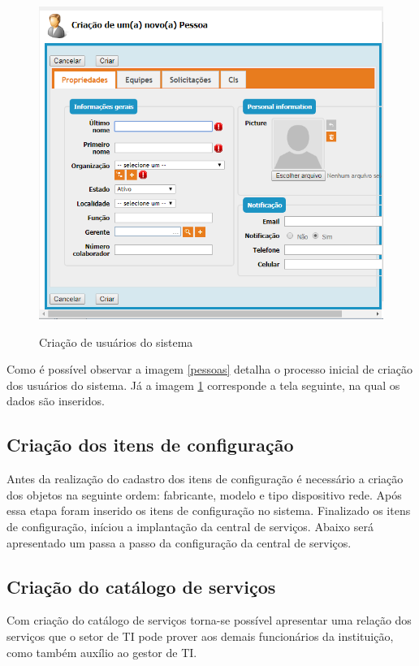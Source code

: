 \documentclass[eso]{bcc}
\begin{document}
\begin{figure}[!h]
\centering
\caption[Criação de usuários do sistema]{Criação de usuários do sistema}
\includegraphics[scale=0.9]{Figuras/criacaodepessoas1.png}
\label{pessoas1}
\end{figure}

Como é possível observar a imagem \ref{pessoas} detalha o processo inicial de criação dos usuários do sistema. Já a imagem \ref{pessoas1} corresponde a tela seguinte, na qual os dados são inseridos.


\subsection{Criação dos itens de configuração}
Antes da realização do cadastro dos itens de configuração é necessário a criação dos objetos na seguinte ordem: fabricante, modelo e tipo dispositivo rede. Após essa etapa foram inserido os itens de configuração no sistema.
Finalizado os itens de configuração, iníciou a implantação da central de serviços.  Abaixo será apresentado um passa a passo da configuração da central de serviços.

\subsection{Criação do catálogo de serviços}

Com criação do catálogo de serviços torna-se possível apresentar uma relação dos serviços que o setor de TI pode prover aos demais funcionários da instituição, como também auxílio ao gestor de TI.
\end{document}
